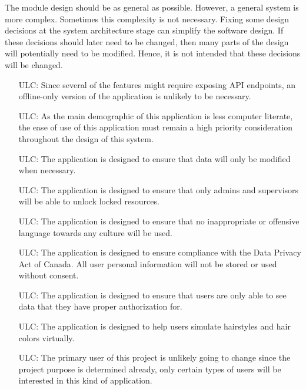 \documentclass[12pt, titlepage]{article}
\newcounter{ucnum}
\begin{document}
The module design should be as general as possible. However, a general system is
more complex. Sometimes this complexity is not necessary. Fixing some design
decisions at the system architecture stage can simplify the software design. If
these decisions should later need to be changed, then many parts of the design
will potentially need to be modified. Hence, it is not intended that these
decisions will be changed.

\noindent \begin{itemize}

\item[ULC\refstepcounter{ucnum}\theucnum\label{ULC_meaningfulLabel}:] 
Since several of the features might require exposing API endpoints, an offline-only version of the application is unlikely to be necessary. 
\item[ULC\refstepcounter{ucnum}\theucnum\label{ULC_meaningfulLabel}:] 
As the main demographic of this application is less computer literate, the ease of use of this application must remain a high priority consideration throughout the design of this system.
\item[ULC\refstepcounter{ucnum}\theucnum\label{ULC_meaningfulLabel}:] 
The application is designed to ensure that data will only be modified when necessary. 
\item[ULC\refstepcounter{ucnum}\theucnum\label{ULC_meaningfulLabel}:] 
The application is designed to ensure that only admins and supervisors will be able to unlock locked resources.
\item[ULC\refstepcounter{ucnum}\theucnum\label{ULC_meaningfulLabel}:] 
The application is designed to ensure that no inappropriate or offensive language towards any culture will be used.
\item[ULC\refstepcounter{ucnum}\theucnum\label{ULC_meaningfulLabel}:] 
The application is designed to ensure compliance with the Data Privacy Act of Canada. All user personal information will not be stored or used without consent. 
\item[ULC\refstepcounter{ucnum}\theucnum\label{ULC_meaningfulLabel}:] 
The application is designed to ensure that users are only able to see data that they have proper authorization for.
\item[ULC\refstepcounter{ucnum}\theucnum\label{ULC_meaningfulLabel}:] 
The application is designed to help users simulate hairstyles and hair colors virtually.
\item[ULC\refstepcounter{ucnum}\theucnum\label{ULC_meaningfulLabel}:] 
The primary user of this project is unlikely going to change since the project purpose is determined already, only certain types of users will be interested in this kind of application.

\end{itemize}
\end{document}
